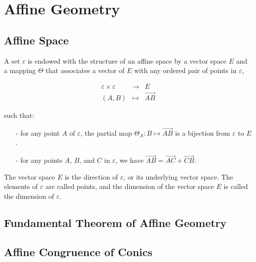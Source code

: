 \chapter{Affine Geometry}

\section{Affine Space}

A set $\varepsilon$ is endowed with the structure of an affine space by a vector space $E$ and a
mapping $\Theta$ that associates a vector of $E$ with any ordered pair of points in
$\varepsilon$,

\begin{eqnarray*}
  \varepsilon \times \varepsilon &\longrightarrow & E \\
  (A,B) &\longmapsto & \overrightarrow{AB}
\end{eqnarray*}

such that:

\begin{itemize}
  \item[-]{for any point $A$ of $\varepsilon$, the partial map $\Theta_A : B \mapsto \overrightarrow{AB}$
      is a bijection from $\varepsilon$ to $E$.}
  \item[-]{for any points $A$, $B$, and $C$ in $\varepsilon$, we have $\overrightarrow{AB}=
      \overrightarrow{AC}+\overrightarrow{CB}$.}
\end{itemize}

The vector space $E$ is the direction of $\varepsilon$, or its underlying vector space. The
elements of $\varepsilon$ are called points, and the dimension of the vector space $E$ is called
the dimension of $\varepsilon$. \cite{audin}\\

\section{Fundamental Theorem of Affine Geometry}

\section{Affine Congruence of Conics}
